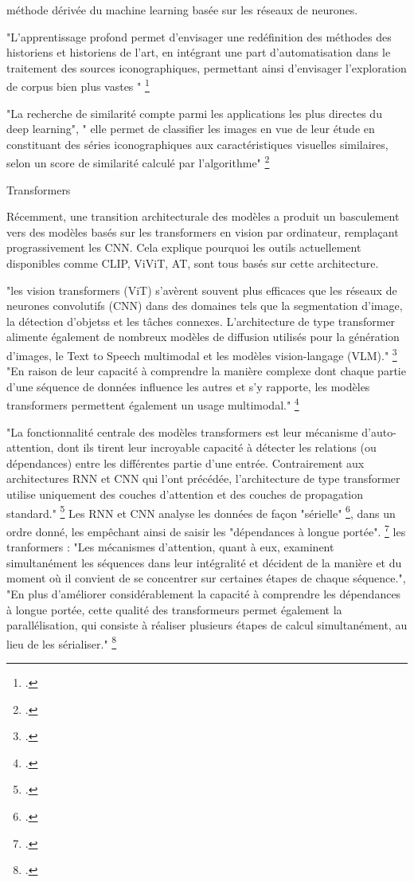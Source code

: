 \begin{itemize}
méthode dérivée du machine learning basée sur les réseaux de neurones. 

"L’apprentissage profond permet d’envisager une redéfinition des méthodes des historiens et historiens de l’art, en intégrant une part d’automatisation dans le traitement des sources iconographiques, permettant ainsi
d’envisager l’exploration de corpus bien plus vastes " \footcite{norindr2023}

"La recherche de similarité compte parmi les applications les plus directes du deep learning", " elle permet de classifier les images en vue de leur étude en	constituant des séries iconographiques aux caractéristiques visuelles similaires, selon un	score de similarité calculé par l’algorithme" \footcite{norindr2023}

\subitem Transformers 

Récemment, une transition architecturale des modèles a produit un basculement vers des modèles basés sur les transformers en vision par ordinateur, remplaçant prograssivement les CNN. Cela explique pourquoi les outils actuellement disponibles comme CLIP, ViViT, AT, sont tous basés sur cette architecture. 

"les vision transformers (ViT) s’avèrent souvent plus efficaces que les réseaux de neurones convolutifs (CNN) dans des domaines tels que la segmentation d’image, la détection d’objetss et les tâches connexes. L’architecture de type transformer alimente également de nombreux modèles de diffusion utilisés pour la génération d’images, le Text to Speech multimodal et les modèles vision-langage (VLM)." \footcite{bergmann2025}
"En raison de leur capacité à comprendre la manière complexe dont chaque partie d’une séquence de données influence les autres et s’y rapporte, les modèles transformers permettent également un usage multimodal." \footcite{bergmann2025}

"La fonctionnalité centrale des modèles transformers est leur mécanisme d’auto-attention, dont ils tirent leur incroyable capacité à détecter les relations (ou dépendances) entre les différentes partie d’une entrée. Contrairement aux architectures RNN et CNN qui l’ont précédée, l’architecture de type transformer utilise uniquement des couches d’attention et des couches de propagation standard." \footcite{bergmann2025}
Les RNN et CNN analyse les données de façon "sérielle" \footcite{bergmann2025}, dans un ordre donné, les empêchant ainsi de saisir les "dépendances à longue portée". \footcite{bergmann2025}
les tranformers : "Les mécanismes d’attention, quant à eux, examinent simultanément les séquences dans leur intégralité et décident de la manière et du moment où il convient de se concentrer sur certaines étapes de chaque séquence.", "En plus d’améliorer considérablement la capacité à comprendre les dépendances à longue portée, cette qualité des transformeurs permet également la parallélisation, qui consiste à réaliser plusieurs étapes de calcul simultanément, au lieu de les sérialiser." \footcite{bergmann2025}


\end{itemize}
